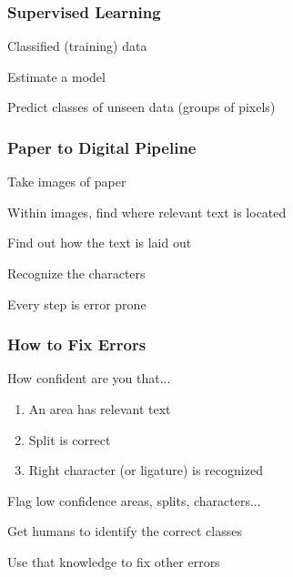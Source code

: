 \documentclass[compress, black]{beamer}
\begin{document}
\begin{frame}
\frametitle{Supervised Learning}
\begin{large_enum}
  \item[--]<1->Classified (training) data
  \item[--]<2->Estimate a model\\ \pause \normalsize
  \item[--]<5->Predict classes of unseen data (groups of pixels)
\end{large_enum}
\end{frame}

\begin{frame}
\frametitle{Paper to Digital Pipeline}
  \begin{large_enum}
    \item[--]<1-> Take images of paper
    \item[--]<1-> Within images, find where \alert{relevant} text is located
    \item[--]<1-> Find out how the text is laid out
    \item[--]<1-> Recognize the characters
    \item[--]<2-> \alert{Every step is error prone}
  \end{large_enum}
\end{frame}

\begin{frame}
\end{frame}
\begin{frame}
\frametitle{How to Fix Errors}
  \begin{large_enum}
    \item[--]<1->How confident are you that...
    \begin{enumerate}
      \item[--]<2-> An area has \alert{relevant} text
      \item[--]<3-> Split is correct
      \item[--]<4-> Right character (or ligature) is recognized
    \end{enumerate}
    \item[--]<5-> Flag low confidence areas, splits, characters...
    \item[--]<6-> Get humans to identify the correct classes
    \item[--]<7-> Use that knowledge to fix other errors
     \end{large_enum}
\end{frame}
\end{document}
